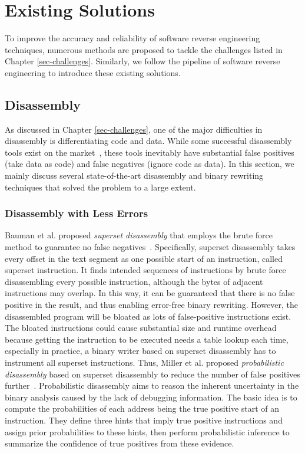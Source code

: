 \chapter{Existing Solutions}\label{sec-existing-solutions}

To improve the accuracy and reliability of software reverse engineering
techniques, numerous methods are proposed to tackle the challenges listed in
Chapter \ref{sec-challenges}.
Similarly, we follow the pipeline of software reverse engineering to introduce
these existing solutions.

\section{Disassembly} \label{sec:existing-disassembly}
As discussed in Chapter \ref{sec-challenges}, one of the major difficulties in
disassembly is differentiating code and data. While some successful disassembly
tools exist on the market~\cite{hex2014ida,kvroustek2017retdec,ghidra,radare},
these tools inevitably have substantial false positives (take data as code) and
false negatives (ignore code as data). In this section, we mainly discuss
several state-of-the-art disassembly and binary rewriting techniques that
solved the problem to a large extent.

\subsection{Disassembly with Less Errors} \label{sec:existing-less-errors}
Bauman et al. proposed \textit{superset disassembly} that employs the brute force method to guarantee no false negatives~\cite{bauman2018superset}. Specifically, superset disassembly takes every offset in the text segment as one possible start of an instruction, called superset instruction. It finds intended sequences of instructions by brute force disassembling every possible instruction, although the bytes of adjacent instructions may overlap.
%
In this way, it can be guaranteed that there is no false positive in the result, and thus enabling error-free binary rewriting. However, the disassembled program will be bloated as lots of false-positive instructions exist. The bloated instructions could cause substantial size and runtime overhead because getting the instruction to be executed needs a table lookup each time, especially in practice, a binary writer based on superset disassembly has to instrument all superset instructions.
Thus, Miller et al. proposed \textit{probabilistic disassembly} based on superset disassembly to reduce the number of false positives further~\cite{miller2019probabilistic}. Probabilistic disassembly aims to reason the inherent uncertainty in the binary analysis caused by the lack of debugging information. The basic idea is to compute the probabilities of each address being the true positive start of an instruction. They define three hints that imply true positive instructions and assign prior probabilities to these hints, then perform probabilistic inference to summarize the confidence of true positives from these evidence.

